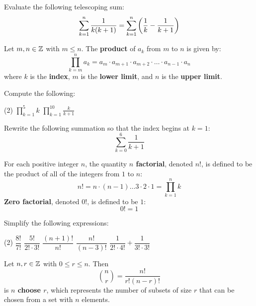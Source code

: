 \documentclass[../mathNotesPreamble]{subfiles}
\begin{document}
  \begin{ex*}
    Evaluate the following telescoping sum:
      \[\sum_{k=1}^n \frac{1}{k(k+1)}=\sum_{k=1}^n {\left(\frac{1}{k}-\frac{1}{k+1}\right)}\]
  \end{ex*}
  \pagebreak

  \begin{defn*}
    Let $m,n\in \mathbb{Z}$ with $m\leq n$. The \textbf{product} of $a_k$ from $m$ to $n$ is given by:
      \[\prod_{k=m}^n a_k= a_m\cdot a_{m+1}\cdot a_{m+2}\cdot \dots\cdot a_{n-1}\cdot a_n\]
    where $k$ is the \textbf{index}, $m$ is the \textbf{lower limit}, and $n$ is the \textbf{upper limit}.
  \end{defn*}
  \begin{ex*}
    Compute the following:
    \begin{extasks}[after-item-skip=\stretch{1}](2)
      \task $\displaystyle \prod_{k=1}^5 k$
      \task $\displaystyle \prod_{k=1}^{10} \frac{k}{k+1}$
    \end{extasks}
  \end{ex*}

  \begin{ex*}
    Rewrite the following summation so that the index begins at $k=1$:
      \[\sum_{k=0}^6 \frac{1}{k+1}\]
  \end{ex*}
  \pagebreak

  \begin{defn*}
    For each positive integer $n$, the quantity \textbf{$n$ factorial}, denoted $n!$, is defined to be the product of all of the integers from $1$ to $n$:
      \[n!=n\cdot (n-1)\dots 3\cdot 2\cdot 1=\prod_{k=1}^n k\]
    \textbf{Zero factorial}, denoted $0!$, is defined to be $1$:
      \[0!=1\]
  \end{defn*}
  \begin{ex*}
    Simplify the following expressions:
    \begin{extasks}[after-item-skip=\stretch{1}](2)
      \task $\dfrac{8!}{7!}$
      \task $\dfrac{5!}{2!\cdot 3!}$
      \task $\dfrac{(n+1)!}{n!}$
      \task $\dfrac{n!}{(n-3)!}$
      \task* $\dfrac{1}{2!\cdot 4!}+\dfrac{1}{3!\cdot 3!}$
    \end{extasks}
  \end{ex*}
  \begin{defn*}
    Let $n, r\in\mathbb{Z}$ with $0\leq r\leq n$. Then
      \[{n \choose r} =\frac{n!}{r!(n-r)!}\]
    is \textbf{$n$ choose $r$}, which represents the number of subsets of size $r$ that can be chosen from a set with $n$ elements.
  \end{defn*}

  \pagebreak
\end{document}
